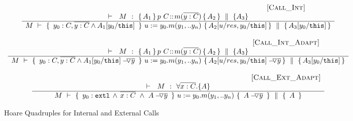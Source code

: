 \begin{figure}[htb]
\small{
$\begin{array}{c}
 \inferruleSD{\hspace{4.7cm} [\sc{Call\_Int}]}
	{
	   	\begin{array}{l}
		\promises  M {\mprepostN{A_1}{p\ C}{m}{y}{C}{A_2} {A_3}}  
          	\end{array}
		}
	{  \hprovesN {M} 
						{ \  y_0:C,\overline {y:C} \wedge  A_1[y_0/\prg{this}] \ }
						 { \ u:=y_0.m(y_1,.. y_n)\    }
					         { A_2[ u/res,y_0/\prg{this}] } 
						{   A_3[y_0/\prg{this}]   }	
}
 \\
\\
{ \inferruleSD{\hspace{4.7cm} [\sc{Call\_Int\_Adapt}]}
	{
	   	\begin{array}{l}
		\promises  M {\mprepostN{A_1}{p\ C}{m}{y}{C}{A_2} {A_3}}  
          	\end{array}
		}
	{  \hprovesN {M} 
						{ \  y_0:C, \overline {y:C} \wedge {\PushAS {y}{A_1[y_0/\prg{this}]}}  \ }  
						{ \ u:=y_0.m(y_1,.. y_n)\    }
						{  { \PushAS {y}{A_2[ u/res,y_0/\prg{this}]}}   }
						{   A_3[y_0/\prg{this}]  }	
}
}
\\
 \\ 
 \inferruleSD{\hspace{4.7cm} [\sc{Call\_Ext}\_Adapt]}
 	{ 
   	 \promises M   {\TwoStatesN {\overline {x:C}} {A}} 
        }
	{   \hprovesN{M} 
						{ \    { \external{y_0}} \,     \wedge \,  \overline{x:C}\  \wedge\ {\PushAS {y}{A}}\ }  
						{ \ u:=y_0.m(y_1,.. y_n)\    }
						{ \   {\PushAS {y}{A}}  \ }
						{\  A \   }	
}

\end{array}
$
}
\caption{Hoare Quadruples for Internal and External Calls}
\label{f:internal:calls}
\label{f:external:calls}
\label{f:calls}
\end{figure}


